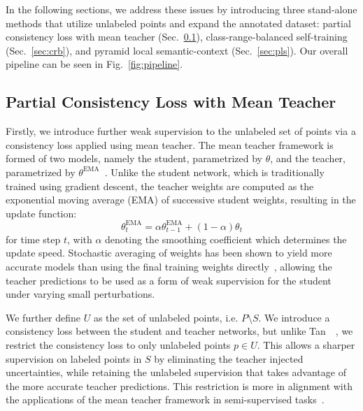 \documentclass[10pt,twocolumn,letterpaper]{article}
\begin{document}
In the following sections, we address these issues by introducing three stand-alone methods that utilize unlabeled points and expand the annotated dataset: partial consistency loss with mean teacher (Sec.~\ref{sec:mt}), class-range-balanced self-training (Sec.~\ref{sec:crb}), and pyramid local semantic-context (Sec.~\ref{sec:pls}). Our overall pipeline can be seen in Fig.~\ref{fig:pipeline}.

\subsection{Partial Consistency Loss with Mean Teacher} \label{sec:mt}

Firstly, we introduce further weak supervision to the unlabeled set of points via a consistency loss applied using mean teacher. The mean teacher framework is formed of two models, namely the student, parametrized by $\theta$, and the teacher, parametrized by $\theta^\textrm{EMA}$~\cite{nips2017meanteacher}. Unlike the student network, which is traditionally trained using gradient descent, the teacher weights are computed as the exponential moving average (EMA) of successive student weights, resulting in the update function:
\begin{equation} \label{eq:ema}
    \theta^\textrm{EMA}_t = \alpha \theta^\textrm{EMA}_{t-1} + (1-\alpha) \theta_t
\end{equation}
for time step $t$, with $\alpha$ denoting the smoothing coefficient which determines the update speed. Stochastic averaging of weights has been shown to yield more accurate models than using the final training weights directly~\cite{siam1992averaging, nips2017meanteacher}, allowing the teacher predictions to be used as a form of weak supervision for the student under varying small perturbations.

We further define $U$ as the set of unlabeled points, i.e. $P \setminus S$. We introduce a consistency loss between the student and teacher networks, but unlike Tan~\etal~\cite{isbd2019wssmt}, we restrict the consistency loss to only unlabeled points $p \in U$. This allows a sharper supervision on labeled points in $S$ by eliminating the teacher injected uncertainties, while retaining the unlabeled supervision that takes advantage of the more accurate teacher predictions. This restriction is more in alignment with the applications of the mean teacher framework in semi-supervised tasks~\cite{nips2017meanteacher, arvix2020structured, cvpr2021temporalaction}.
\end{document}
